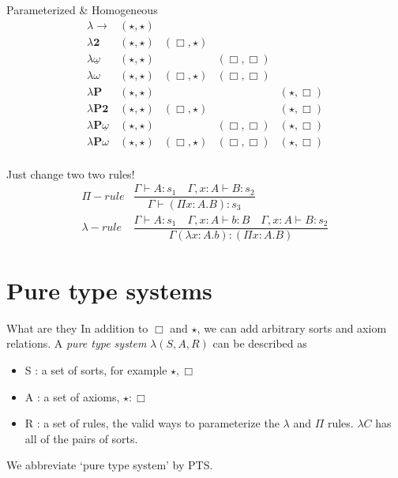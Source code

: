 \documentclass{beamer}
\begin{document}
    \begin{frame}{Parameterized \& Homogeneous}
        \[\begin{array}{l|cccc}
            \lambda\rightarrow & (\star, \star)\\
            \lambda \textbf{2} & (\star, \star) & (\Box, \star) \\
            \lambda \underline\omega & (\star, \star) && (\Box, \Box) \\
            \lambda \omega& (\star, \star) & (\Box, \star) & (\Box, \Box) \\
            \lambda\textbf{P} & (\star, \star) &&& (\star, \Box)\\
            \lambda \textbf{P2} & (\star, \star) & (\Box, \star)&& (\star, \Box) \\
            \lambda \textbf{P}\underline\omega & (\star, \star) && (\Box, \Box)& (\star, \Box) \\
            \lambda \textbf{P}\omega& (\star, \star) & (\Box, \star) & (\Box, \Box)&(\star, \Box) \\
        \end{array}\]
    \end{frame}

    \begin{frame}{Just change two two rules!}
        \[\begin{array}{lc}
            \Pi{-}rule & \dfrac{\Gamma \vdash A : s_1\quad \Gamma, x : A \vdash B : s_2}{\Gamma \vdash (\Pi x : A . B) : s_3} \\[1cm]
            \lambda{-}rule &\dfrac{\Gamma \vdash A : s_1\quad \Gamma, x : A \vdash b : B\quad \Gamma, x : A \vdash B : s_2}{\Gamma (\lambda x: A .b) : (\Pi x : A . B)}
        \end{array}\]
    \end{frame}

    \section{Pure type systems}

    \begin{frame}{What are they}
        In addition to $\Box$ and $\star$, we can add arbitrary sorts and axiom relations. A \textit{pure type system} $\lambda(S, A, R)$ can be described as 
        \begin{itemize}
            \item<1-> S : a set of sorts, for example $\star, \Box$
                \pause
            \item<2-> A : a set of axioms, $\star : \Box$
                \pause
            \item<3-> R : a set of rules, the valid ways to parameterize the $\lambda$ and $\Pi$ rules. $\lambda C$ has all of the pairs of sorts.
        \end{itemize}
        \pause
        We abbreviate `pure type system' by PTS.
    \end{frame}
\end{document}
